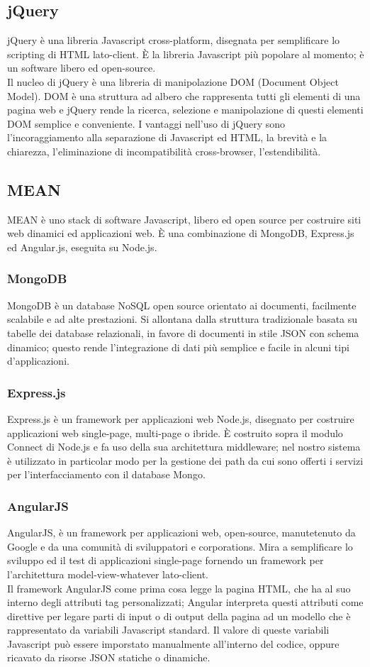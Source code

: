 	\subsection{jQuery}{
		jQuery è una libreria Javascript cross-platform, disegnata per semplificare lo scripting di HTML lato-client. È la libreria Javascript più popolare al momento; è un software libero ed open-source. \\
		Il nucleo di jQuery è una libreria di manipolazione DOM (Document Object Model). DOM è una struttura ad albero che rappresenta tutti gli elementi di una pagina web e jQuery rende la ricerca, selezione e manipolazione di questi elementi DOM semplice e conveniente.
		I vantaggi nell'uso di jQuery sono l'incoraggiamento alla separazione di Javascript ed HTML, la brevità e la chiarezza, l'eliminazione di incompatibilità cross-browser, l'estendibilità.
	}
	\subsection{MEAN}{
		MEAN è uno stack di software Javascript, libero ed open source per costruire siti web dinamici ed applicazioni web. È una combinazione di MongoDB, Express.js ed Angular.js, eseguita su Node.js.
	}
	\subsubsection{MongoDB}{
		MongoDB è un database NoSQL open source orientato ai documenti, facilmente scalabile e ad alte prestazioni. Si allontana dalla struttura tradizionale basata su tabelle dei database relazionali, in favore di documenti in stile JSON con schema dinamico; questo rende l'integrazione di dati più semplice e facile in alcuni tipi d'applicazioni.
	}
	\subsubsection{Express.js}{
		Express.js è un framework per applicazioni web Node.js, disegnato per costruire applicazioni web single-page, multi-page o ibride.
		È costruito sopra il modulo Connect di Node.js e fa uso della sua architettura middleware; nel nostro sistema è utilizzato in particolar modo per la gestione dei path da cui sono  offerti i servizi per l'interfacciamento con il database Mongo.
	}
	\subsubsection{AngularJS}{
		AngularJS, è un framework per applicazioni web, open-source, manutetenuto da Google e da una comunità di sviluppatori e corporations. Mira a semplificare lo sviluppo ed il test di applicazioni single-page fornendo un framework per l'architettura model-view-whatever lato-client. \\
		Il framework AngularJS come prima cosa legge la pagina HTML, che ha al suo interno degli attributi tag personalizzati; Angular interpreta questi attributi come direttive per legare parti di input o di output della pagina ad un modello che è rappresentato da variabili Javascript standard. Il valore di queste variabili Javascript può essere imporstato manualmente all'interno del codice, oppure ricavato da risorse JSON statiche o dinamiche.
	}
